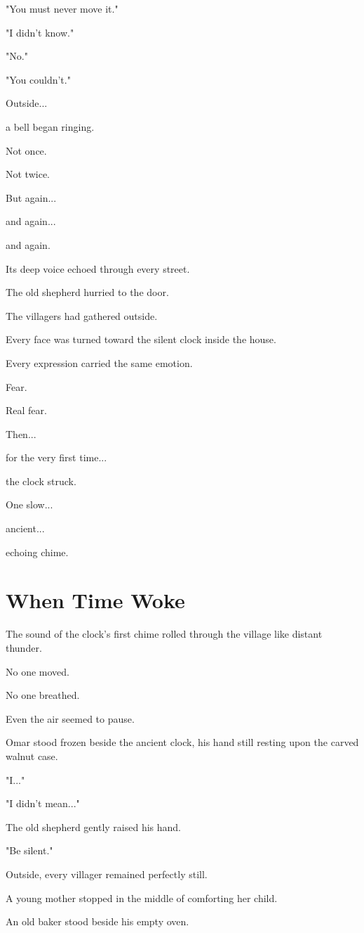 \documentclass[12pt,openany]{book}
\begin{document}
"You must never move it."

"I didn't know."

"No."

"You couldn't."

Outside...

a bell began ringing.

Not once.

Not twice.

But again...

and again...

and again.

Its deep voice echoed through every street.

The old shepherd hurried to the door.

The villagers had gathered outside.

Every face was turned toward the silent clock inside the house.

Every expression carried the same emotion.

Fear.

Real fear.

Then...

for the very first time...

the clock struck.

One slow...

ancient...

echoing chime.
\section*{When Time Woke}

The sound of the clock's first chime rolled through the village like distant thunder.

No one moved.

No one breathed.

Even the air seemed to pause.

Omar stood frozen beside the ancient clock, his hand still resting upon the carved walnut case.

"I..."

"I didn't mean..."

The old shepherd gently raised his hand.

"Be silent."

Outside, every villager remained perfectly still.

A young mother stopped in the middle of comforting her child.

An old baker stood beside his empty oven.
\end{document}
